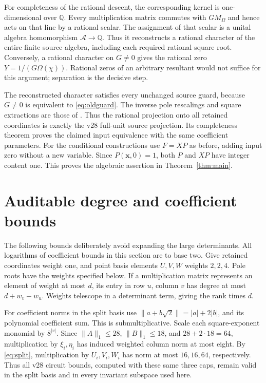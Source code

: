 \documentclass[11pt,a4paper]{article}
\theoremstyle{remark}\newtheorem{remark}[theorem]{Remark}
\newcommand{\Q}{\mathbb Q}\newcommand{\Z}{\mathbb Z}\newcommand{\F}{\mathbb F}\newcommand{\C}{\mathbb C}
\begin{document}
For completeness of the rational descent, the corresponding kernel is
one-dimensional over $\Q$. Every multiplication matrix commutes with
$G M_\Omega$ and hence acts on that line by a rational scalar. The
assignment of that scalar is a unital algebra homomorphism
$\mathcal A\to\Q$. Thus it reconstructs a rational character of the
entire finite source algebra, including each required rational square
root. Conversely, a rational character on $G\ne0$ gives the rational
zero $Y=1/(G\Omega(\chi))$. Rational zeros of an arbitrary resultant
would not suffice for this argument; separation is the decisive step.

The reconstructed character satisfies every unchanged source guard,
because $G\ne0$ is equivalent to \eqref{eq:oldguard}. The inverse pole
rescalings and square extractions are those of \cite{UnitNorm}. Thus the
rational projection onto all retained coordinates is exactly the v28
full-unit source projection. Its completeness theorem proves the
claimed input equivalence with the same coefficient parameters.
For the conditional constructions use $F=XP$ as before, adding input
zero without a new variable. Since $P(\boldsymbol x,0)=1$, both $P$
and $XP$ have integer content one. This proves the algebraic assertion
in Theorem~\ref{thm:main}.

\section{Auditable degree and coefficient bounds}
The following bounds deliberately avoid expanding the large determinants.
All logarithms of coefficient bounds in this section are to base two.
Give retained coordinates weight one, and point basis elements $U,V,W$
weights $2,2,4$. Pole roots have the weights specified below.
If a multiplication matrix represents an element of weight at most $d$,
its entry in row $u$, column $v$ has degree at most $d+w_v-w_u$.
Weights telescope in a determinant term, giving the rank times $d$.

For coefficient norms in the split basis use
$\|a+b\sqrt2\|=|a|+2|b|$, and its polynomial coefficient sum.
This is submultiplicative. Scale each square-exponent monomial by
$8^{|v|}$. Since $\|A\|_1\le28$, $\|B\|_1\le18$, and
$28+2\cdot18=64$, multiplication by $\xi_i,\eta_i$ has induced
weighted column norm at most eight. By \eqref{eq:split}, multiplication
by $U_i,V_i,W_i$ has norm at most $16,16,64$, respectively. Thus
all v28 circuit bounds, computed with these same three caps, remain
valid in the split basis and in every invariant subspace used here.
\end{document}
